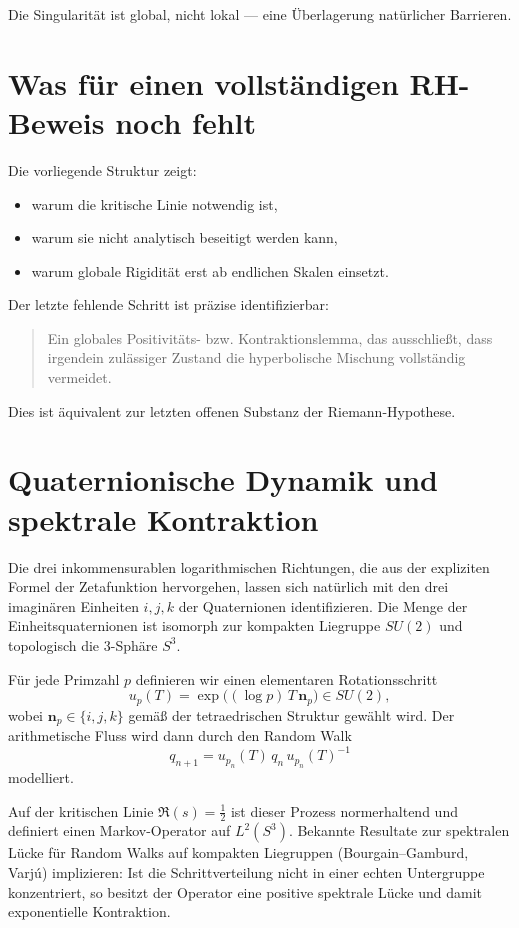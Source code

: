 \documentclass[11pt,a4paper]{article}
\begin{document}
Die Singularität ist global, nicht lokal --- eine Überlagerung natürlicher Barrieren.

\section{Was für einen vollständigen RH-Beweis noch fehlt}

Die vorliegende Struktur zeigt:
\begin{itemize}
\item warum die kritische Linie notwendig ist,
\item warum sie nicht analytisch beseitigt werden kann,
\item warum globale Rigidität erst ab endlichen Skalen einsetzt.
\end{itemize}

Der letzte fehlende Schritt ist präzise identifizierbar:

\begin{quote}
Ein globales Positivitäts- bzw. Kontraktionslemma, das ausschließt, dass irgendein zulässiger Zustand die hyperbolische Mischung vollständig vermeidet.
\end{quote}

Dies ist äquivalent zur letzten offenen Substanz der Riemann-Hypothese.

\section{Quaternionische Dynamik und spektrale Kontraktion}

Die drei inkommensurablen logarithmischen Richtungen, die aus der expliziten Formel der Zetafunktion hervorgehen, lassen sich natürlich mit den drei imaginären Einheiten $i,j,k$ der Quaternionen identifizieren.
Die Menge der Einheitsquaternionen ist isomorph zur kompakten Liegruppe $SU(2)$ und topologisch die $3$-Sphäre $S^3$.

Für jede Primzahl $p$ definieren wir einen elementaren Rotationsschritt
\[
u_p(T)=\exp\!\big((\log p)\,T\,\mathbf{n}_p\big)\in SU(2),
\]
wobei $\mathbf{n}_p\in\{i,j,k\}$ gemäß der tetraedrischen Struktur gewählt wird.
Der arithmetische Fluss wird dann durch den Random Walk
\[
q_{n+1}=u_{p_n}(T)\,q_n\,u_{p_n}(T)^{-1}
\]
modelliert.

Auf der kritischen Linie $\Re(s)=\tfrac12$ ist dieser Prozess normerhaltend und definiert einen Markov-Operator auf $L^2(S^3)$.
Bekannte Resultate zur spektralen Lücke für Random Walks auf kompakten Liegruppen (Bourgain--Gamburd, Varjú) implizieren:
Ist die Schrittverteilung nicht in einer echten Untergruppe konzentriert, so besitzt der Operator eine positive spektrale Lücke und damit exponentielle Kontraktion.
\end{document}
